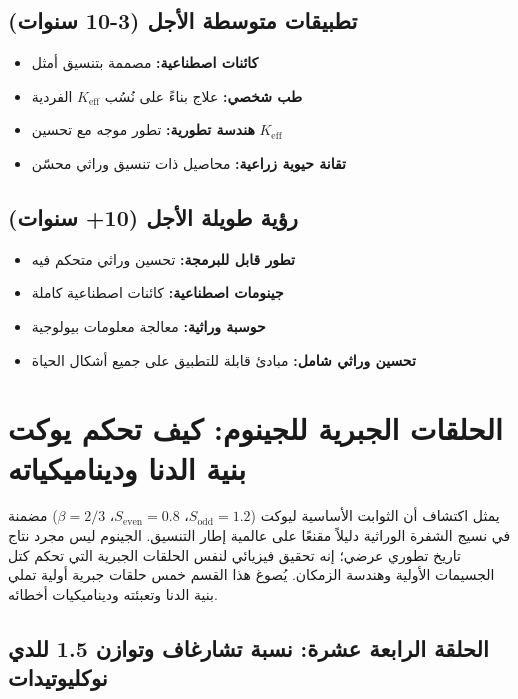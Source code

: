 \documentclass[11pt,a4paper]{article}
\newcommand{\Sodd}{S_{\mathrm{odd}}}
\newcommand{\Seven}{S_{\mathrm{even}}}
\begin{document}
	\subsection{تطبيقات متوسطة الأجل (3-10 سنوات)}
	
	\begin{itemize}
		\item \textbf{كائنات اصطناعية:} مصممة بتنسيق أمثل
		\item \textbf{طب شخصي:} علاج بناءً على نُسُب $K_{\text{eff}}$ الفردية
		\item \textbf{هندسة تطورية:} تطور موجه مع تحسين $K_{\text{eff}}$
		\item \textbf{تقانة حيوية زراعية:} محاصيل ذات تنسيق وراثي محسّن
	\end{itemize}
	
	\subsection{رؤية طويلة الأجل (10+ سنوات)}
	
	\begin{itemize}
		\item \textbf{تطور قابل للبرمجة:} تحسين وراثي متحكم فيه
		\item \textbf{جينومات اصطناعية:} كائنات اصطناعية كاملة
		\item \textbf{حوسبة وراثية:} معالجة معلومات بيولوجية
		\item \textbf{تحسين وراثي شامل:} مبادئ قابلة للتطبيق على جميع أشكال الحياة
	\end{itemize}
	
	\section{الحلقات الجبرية للجينوم: كيف تحكم يوكت بنية الدنا وديناميكياته}
	\label{sec:genetic-loops}
	
	يمثل اكتشاف أن الثوابت الأساسية ليوكت (\(\Sodd = 1.2\)، \(\Seven = 0.8\)، \(\beta = 2/3\)) مضمنة في نسيج الشفرة الوراثية دليلاً مقنعًا على عالمية إطار التنسيق. الجينوم ليس مجرد نتاج تاريخ تطوري عرضي؛ إنه تحقيق فيزيائي لنفس الحلقات الجبرية التي تحكم كتل الجسيمات الأولية وهندسة الزمكان. يُصوغ هذا القسم خمس حلقات جبرية أولية تملي بنية الدنا وتعبئته وديناميكيات أخطائه.
	
	\subsection{الحلقة الرابعة عشرة: نسبة تشارغاف وتوازن 1.5 للدي نوكليوتيدات}
	
\end{document}
